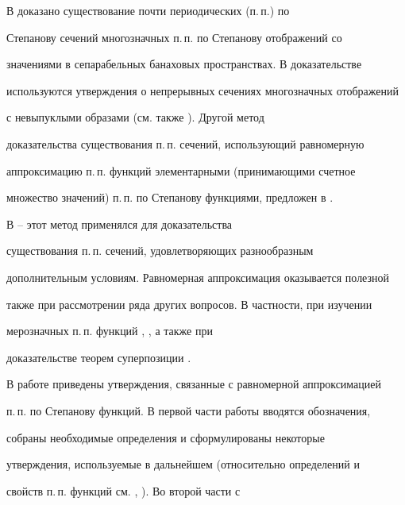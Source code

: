 




\maketitle


\label{begin}





В \cite{1} доказано существование почти периодических (п.\,п.) по


Степанову сечений многозначных п.\,п. по Степанову отображений со


значениями в сепарабельных банаховых пространствах. В доказательстве


используются утверждения о непрерывных сечениях многозначных отображений


с невыпуклыми образами \cite{2} (см. также \cite{3}). Другой метод


доказательства существования п.\,п. сечений, использующий равномерную


аппроксимацию п.\,п. функций элементарными (принимающими счетное


множество значений) п.\,п. по Степанову функциями, предложен в \cite{4}.


В \cite{4}--\cite{7} этот метод применялся для доказательства


существования п.\,п. сечений, удовлетворяющих разнообразным


дополнительным условиям. Равномерная аппроксимация оказывается полезной


также при рассмотрении ряда других вопросов. В частности, при изучении


мерозначных п.\,п. функций \cite{8}, \cite{9}, а также при


доказательстве теорем суперпозиции \cite{10}.





В работе приведены утверждения, связанные с равномерной аппроксимацией


п.\,п. по Степанову функций. В первой части работы вводятся обозначения,


собраны необходимые определения и сформулированы некоторые


утверждения, используемые в дальнейшем (относительно определений и


свойств п.\,п. функций см. \cite{11}, \cite{12}). Во второй части с


